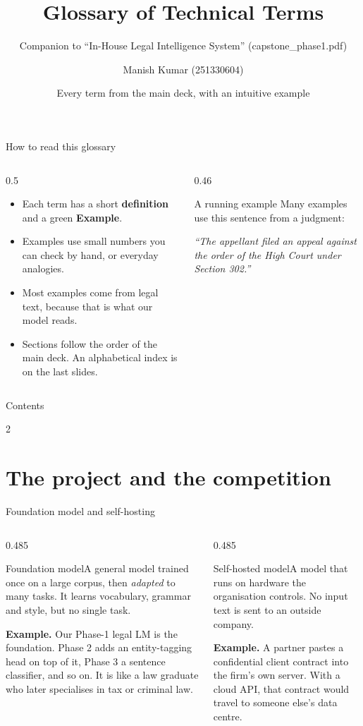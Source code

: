 \documentclass[aspectratio=169,11pt]{beamer}
\title[CS-781 Capstone: Glossary]{Glossary of Technical Terms}
\subtitle{Companion to ``In-House Legal Intelligence System'' (capstone\_phase1.pdf)}
\author[Manish Kumar]{Manish Kumar (251330604)}
\institute{CS-781, IIT Kanpur}
\date[Glossary]{Every term from the main deck, with an intuitive example}
\newcommand{\term}[3]{%
  \begin{block}{#1}\small #2\par\vspace{1mm}%
  {\color{exgreen}\textbf{Example.}} #3\end{block}}
\newcommand{\twoterms}[6]{%
  \begin{columns}[T]
    \begin{column}{0.485\textwidth}\term{#1}{#2}{#3}\end{column}
    \begin{column}{0.485\textwidth}\term{#4}{#5}{#6}\end{column}
  \end{columns}}
\begin{document}
\begin{frame}
  \titlepage
\end{frame}

\begin{frame}{How to read this glossary}
  \begin{columns}[T]
    \begin{column}{0.5\textwidth}
      \small
      \begin{itemize}
        \item Each term has a short \textbf{definition} and a green \textcolor{exgreen}{\textbf{Example}}.
        \item Examples use small numbers you can check by hand, or everyday analogies.
        \item Most examples come from legal text, because that is what our model reads.
        \item Sections follow the order of the main deck. An alphabetical index is on the last slides.
      \end{itemize}
    \end{column}
    \begin{column}{0.46\textwidth}
      \begin{block}{A running example}
        \small
        Many examples use this sentence from a judgment:
        \vspace{1mm}

        \emph{``The appellant filed an appeal against the order of the High Court under Section 302.''}
      \end{block}
    \end{column}
  \end{columns}
\end{frame}

\begin{frame}{Contents}
  \begin{multicols}{2}
  \small
  \tableofcontents
  \end{multicols}
\end{frame}

\section{The project and the competition}

\begin{frame}{Foundation model and self-hosting}
  \twoterms{Foundation model}
  {A general model trained once on a large corpus, then \emph{adapted} to many tasks. It learns vocabulary, grammar and style, but no single task.}
  {Our Phase-1 legal LM is the foundation. Phase 2 adds an entity-tagging head on top of it, Phase 3 a sentence classifier, and so on. It is like a law graduate who later specialises in tax or criminal law.}
  {Self-hosted model}
  {A model that runs on hardware the organisation controls. No input text is sent to an outside company.}
  {A partner pastes a confidential client contract into the firm's own server. With a cloud API, that contract would travel to someone else's data centre.}
\end{frame}
\end{document}
